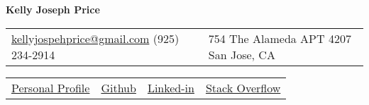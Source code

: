 \documentclass{article}
\begin{document}
\thispagestyle{empty} 

\center \huge{\textbf{Kelly Joseph Price}}
\normalsize

\hspace{.5cm}

\begin{tabularx}{\textwidth}{AX}

    \href{mailto:kellyjosephprice@gmail.com}{kellyjospehprice@gmail.com}\newline
    (925) 234-2914
    
    &

    754 The Alameda APT 4207\newline
    San Jose, CA

\end{tabularx}

\begin{tabularx}{\textwidth}{CCCC}
    \large
    \href{http://kellyjosephprice.github.io}{Personal Profile}
    &
    \large
    \href{https://github.com/kellyjosephprice}{Github}
    &
    \large
    \href{https://www.linkedin.com/pub/kelly-price/22/760/a11}{Linked-in}
    &
    \large
    \href{https://careers.stackoverflow.com/kellyjosephprice}{Stack Overflow}
    \normalsize

    \\
\end{tabularx}
\end{document}
